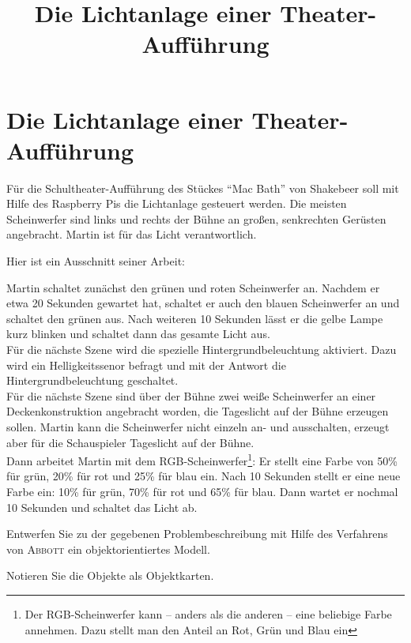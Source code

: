 \documentclass[11pt, a4paper]{scrartcl}
\title{Die Lichtanlage einer Theater-Aufführung}
\begin{document}
\section*{Die Lichtanlage einer Theater-Aufführung}
Für die Schultheater-Aufführung des Stückes \enquote{Mac Bath} von Shakebeer soll mit Hilfe des Raspberry Pis die Lichtanlage gesteuert werden. Die meisten Scheinwerfer sind links und rechts der Bühne an großen, senkrechten Gerüsten angebracht. Martin ist für das Licht verantwortlich. 

\vspace{0.5cm}

Hier ist ein Ausschnitt seiner Arbeit:

\begin{mdframed}
Martin schaltet zunächst den grünen und roten Scheinwerfer an. Nachdem er etwa 20 Sekunden gewartet hat, schaltet er auch den blauen Scheinwerfer an und schaltet den grünen aus. Nach weiteren 10 Sekunden lässt er die gelbe Lampe kurz blinken und schaltet dann das gesamte Licht aus.\\

Für die nächste Szene wird die spezielle Hintergrundbeleuchtung aktiviert. Dazu wird ein Helligkeitssenor befragt und mit der Antwort die Hintergrundbeleuchtung geschaltet.\\

Für die nächste Szene sind über der Bühne zwei weiße Scheinwerfer an einer Deckenkonstruktion angebracht worden, die Tageslicht auf der Bühne erzeugen sollen. Martin kann die Scheinwerfer nicht einzeln an- und ausschalten, erzeugt aber für die Schauspieler Tageslicht auf der Bühne.\\

Dann arbeitet Martin mit dem RGB-Scheinwerfer\footnote{Der RGB-Scheinwerfer kann -- anders als die anderen -- eine beliebige Farbe annehmen. Dazu stellt man den Anteil an Rot, Grün und Blau ein}: Er stellt eine Farbe von 50\% für grün, 20\% für rot und 25\% für blau ein. Nach 10 Sekunden stellt er eine neue Farbe ein: 10\% für grün, 70\% für rot und 65\% für blau. Dann wartet er nochmal 10 Sekunden und schaltet das Licht ab.\\
\end{mdframed}

\vfill

\begin{aufgabe}
Entwerfen Sie zu der gegebenen Problembeschreibung mit Hilfe des Verfahrens von \textsc{Abbott} ein objektorientiertes Modell. 
\end{aufgabe}

\begin{aufgabe}
Notieren Sie die Objekte als Objektkarten.
\end{aufgabe}
\end{document}
